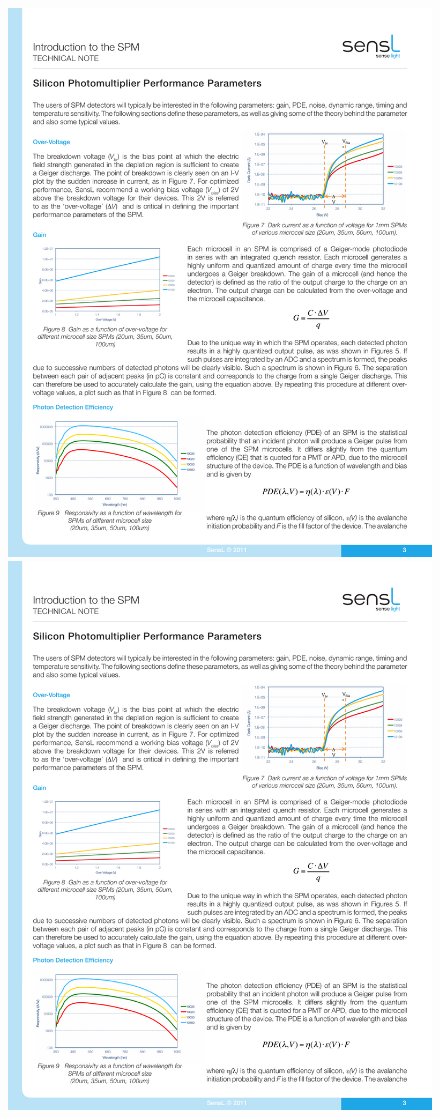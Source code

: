 \begin{figure}[!bhtp]
	\centering
	\includegraphics[scale=0.9]{img/SiPMVb.pdf}
	\includegraphics[scale=0.9]{img/SiPMGain.pdf}

\end{figure}
